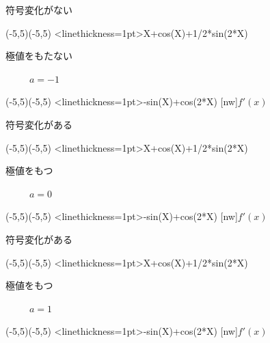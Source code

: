 \documentclass[10pt,
b5paper,
fleqn,
dvipdfmx,
uplatex
]{jsarticle}
\begin{document}
{符号変化がない

\vspace{2zw}

\iffigure
\begin{zahyou}[ul=3mm,yscale=1,xscale=1](-5,5)(-5,5)
\YGraph<linethickness=1pt>{\aval*X+cos(X)+1/2*sin(2*X)}
\end{zahyou}
\fi

極値をもたない

\item \ \ \ \ \ $a=-1$\\
\iffigure
\begin{zahyou}[ul=3mm,yscale=1,xscale=1](-5,5)(-5,5)
\YGraph<linethickness=1pt>{\aval-sin(X)+cos(2*X)}
[nw]{$f'(x)$}
\end{zahyou}
\fi

符号変化がある

\vspace{2zw}

\iffigure
\begin{zahyou}[ul=3mm,yscale=1,xscale=1](-5,5)(-5,5)
\YGraph<linethickness=1pt>{\aval*X+cos(X)+1/2*sin(2*X)}
\end{zahyou}
\fi

極値をもつ

\item \ \ \ \ \ $a=0$\\
\iffigure
\begin{zahyou}[ul=3mm,yscale=1,xscale=1](-5,5)(-5,5)
\YGraph<linethickness=1pt>{\aval-sin(X)+cos(2*X)}
[nw]{$f'(x)$}
\end{zahyou}
\fi

符号変化がある

\vspace{2zw}

\iffigure
\begin{zahyou}[ul=3mm,yscale=1,xscale=1](-5,5)(-5,5)
\YGraph<linethickness=1pt>{\aval*X+cos(X)+1/2*sin(2*X)}
\end{zahyou}
\fi

極値をもつ

\item \ \ \ \ \ $a=1$\\
\iffigure
\begin{zahyou}[ul=3mm,yscale=1,xscale=1](-5,5)(-5,5)
\YGraph<linethickness=1pt>{\aval-sin(X)+cos(2*X)}
[nw]{$f'(x)$}
\end{zahyou}
\fi

}
\end{document}

